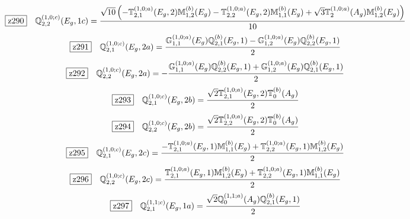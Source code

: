 \documentclass[fleqn,10pt,landscape]{jsarticle}
\begin{document}
\begin{dmath*}
\hspace*{3mm}\fbox{z290}\quad \mathbb{Q}_{2,2}^{(1,0;c)}(E_{g},1c)=\frac{\sqrt{10} \left(- \mathbb{T}_{2,1}^{(1,0;a)}(E_{g},2) \mathbb{M}_{1,2}^{(b)}(E_{g}) - \mathbb{T}_{2,2}^{(1,0;a)}(E_{g},2) \mathbb{M}_{1,1}^{(b)}(E_{g}) + \sqrt{3} \mathbb{T}_{2}^{(1,0;a)}(A_{g}) \mathbb{M}_{1,2}^{(b)}(E_{g})\right)}{10}
\end{dmath*}
\begin{dmath*}
\hspace*{3mm}\fbox{z291}\quad \mathbb{Q}_{2,1}^{(1,0;c)}(E_{g},2a)=\frac{\mathbb{G}_{1,1}^{(1,0;a)}(E_{g}) \mathbb{Q}_{2,1}^{(b)}(E_{g},1) - \mathbb{G}_{1,2}^{(1,0;a)}(E_{g}) \mathbb{Q}_{2,2}^{(b)}(E_{g},1)}{2}
\end{dmath*}
\begin{dmath*}
\hspace*{3mm}\fbox{z292}\quad \mathbb{Q}_{2,2}^{(1,0;c)}(E_{g},2a)=- \frac{\mathbb{G}_{1,1}^{(1,0;a)}(E_{g}) \mathbb{Q}_{2,2}^{(b)}(E_{g},1) + \mathbb{G}_{1,2}^{(1,0;a)}(E_{g}) \mathbb{Q}_{2,1}^{(b)}(E_{g},1)}{2}
\end{dmath*}
\begin{dmath*}
\hspace*{3mm}\fbox{z293}\quad \mathbb{Q}_{2,1}^{(1,0;c)}(E_{g},2b)=\frac{\sqrt{2} \mathbb{T}_{2,1}^{(1,0;a)}(E_{g},2) \mathbb{T}_{0}^{(b)}(A_{g})}{2}
\end{dmath*}
\begin{dmath*}
\hspace*{3mm}\fbox{z294}\quad \mathbb{Q}_{2,2}^{(1,0;c)}(E_{g},2b)=\frac{\sqrt{2} \mathbb{T}_{2,2}^{(1,0;a)}(E_{g},2) \mathbb{T}_{0}^{(b)}(A_{g})}{2}
\end{dmath*}
\begin{dmath*}
\hspace*{3mm}\fbox{z295}\quad \mathbb{Q}_{2,1}^{(1,0;c)}(E_{g},2c)=\frac{- \mathbb{T}_{2,1}^{(1,0;a)}(E_{g},1) \mathbb{M}_{1,1}^{(b)}(E_{g}) + \mathbb{T}_{2,2}^{(1,0;a)}(E_{g},1) \mathbb{M}_{1,2}^{(b)}(E_{g})}{2}
\end{dmath*}
\begin{dmath*}
\hspace*{3mm}\fbox{z296}\quad \mathbb{Q}_{2,2}^{(1,0;c)}(E_{g},2c)=\frac{\mathbb{T}_{2,1}^{(1,0;a)}(E_{g},1) \mathbb{M}_{1,2}^{(b)}(E_{g}) + \mathbb{T}_{2,2}^{(1,0;a)}(E_{g},1) \mathbb{M}_{1,1}^{(b)}(E_{g})}{2}
\end{dmath*}
\begin{dmath*}
\hspace*{3mm}\fbox{z297}\quad \mathbb{Q}_{2,1}^{(1,1;c)}(E_{g},1a)=\frac{\sqrt{2} \mathbb{Q}_{0}^{(1,1;a)}(A_{g}) \mathbb{Q}_{2,1}^{(b)}(E_{g},1)}{2}
\end{dmath*}
\end{document}
